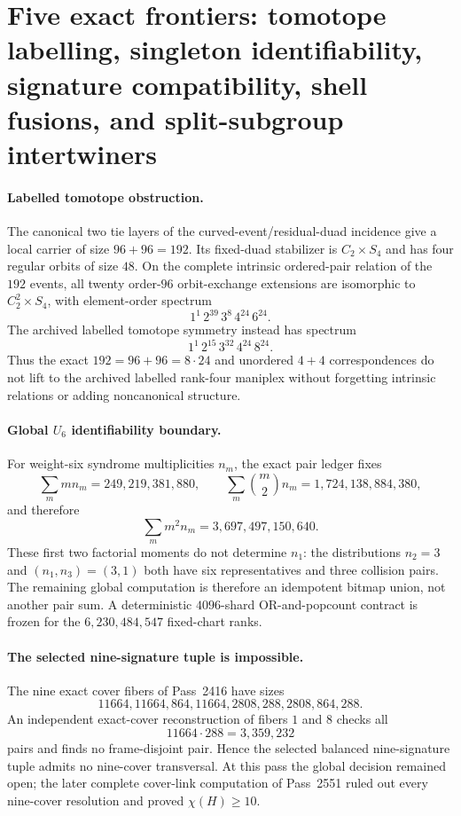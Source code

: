 \section{Five exact frontiers: tomotope labelling, singleton identifiability, signature compatibility, shell fusions, and split-subgroup intertwiners}

\paragraph{Labelled tomotope obstruction.}
The canonical two tie layers of the curved-event/residual-duad incidence give a local carrier of size $96+96=192$.  Its fixed-duad stabilizer is $C_2\times S_4$ and has four regular orbits of size $48$.  On the complete intrinsic ordered-pair relation of the $192$ events, all twenty order-$96$ orbit-exchange extensions are isomorphic to $C_2^2\times S_4$, with element-order spectrum
\[
1^1\,2^{39}\,3^8\,4^{24}\,6^{24}.
\]
The archived labelled tomotope symmetry instead has spectrum
\[
1^1\,2^{15}\,3^{32}\,4^{24}\,8^{24}.
\]
Thus the exact $192=96+96=8\cdot24$ and unordered $4+4$ correspondences do not lift to the archived labelled rank-four maniplex without forgetting intrinsic relations or adding noncanonical structure.

\paragraph{Global $U_6$ identifiability boundary.}
For weight-six syndrome multiplicities $n_m$, the exact pair ledger fixes
\[
\sum_m m n_m=249{,}219{,}381{,}880,
\qquad
\sum_m \binom m2 n_m=1{,}724{,}138{,}884{,}380,
\]
and therefore
\[
\sum_m m^2n_m=3{,}697{,}497{,}150{,}640.
\]
These first two factorial moments do not determine $n_1$: the distributions $n_2=3$ and $(n_1,n_3)=(3,1)$ both have six representatives and three collision pairs.  The remaining global computation is therefore an idempotent bitmap union, not another pair sum.  A deterministic $4096$-shard OR-and-popcount contract is frozen for the $6{,}230{,}484{,}547$ fixed-chart ranks.

\paragraph{The selected nine-signature tuple is impossible.}
The nine exact cover fibers of Pass~2416 have sizes
\[
11664,11664,864,11664,2808,288,2808,864,288.
\]
An independent exact-cover reconstruction of fibers $1$ and $8$ checks all
\[
11664\cdot288=3{,}359{,}232
\]
pairs and finds no frame-disjoint pair.  Hence the selected balanced nine-signature tuple admits no nine-cover transversal.  At this pass the global decision remained open; the later complete cover-link computation of Pass~2551 ruled out every nine-cover resolution and proved $\chi(H)\ge 10$.

